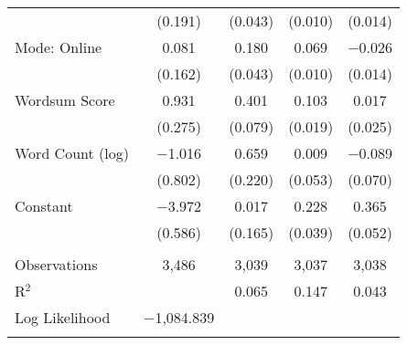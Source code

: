 \begin{table}[!htbp]
\begin{tabular}{@{\extracolsep{0pt}}lcccc}
  & (0.191) & (0.043) & (0.010) & (0.014) \\ 
  Mode: Online & 0.081 & 0.180 & 0.069 & $-$0.026 \\ 
  & (0.162) & (0.043) & (0.010) & (0.014) \\ 
  Wordsum Score & 0.931 & 0.401 & 0.103 & 0.017 \\ 
  & (0.275) & (0.079) & (0.019) & (0.025) \\ 
  Word Count (log) & $-$1.016 & 0.659 & 0.009 & $-$0.089 \\ 
  & (0.802) & (0.220) & (0.053) & (0.070) \\ 
  Constant & $-$3.972 & 0.017 & 0.228 & 0.365 \\ 
  & (0.586) & (0.165) & (0.039) & (0.052) \\ 
 \hline \\[-1.8ex] 
Observations & 3,486 & 3,039 & 3,037 & 3,038 \\ 
R$^{2}$ &  & 0.065 & 0.147 & 0.043 \\ 
Log Likelihood & $-$1,084.839 &  &  &  \\ 
\hline 
\hline \\[-1.8ex] 
\end{tabular} 
\end{table} 
